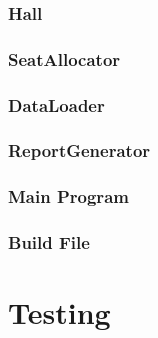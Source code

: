 \documentclass[12pt,a4paper]{report}
\begin{document}
\subsection{Hall}



\subsection{SeatAllocator}



\subsection{DataLoader}



\subsection{ReportGenerator}



\subsection{Main Program}


\subsection{Build File}


\chapter{Testing}
\end{document}
